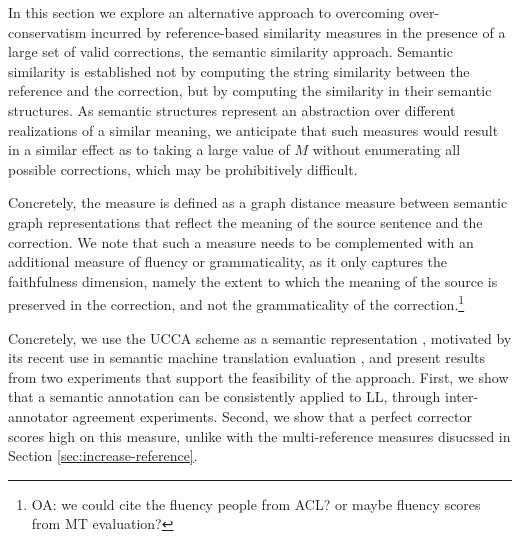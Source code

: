 \documentclass[letter,11pt]{article}
\newcommand{\oa}[1]{\footnote{\color{red}OA: #1}}
\begin{document}
		
		In this section we explore an alternative approach to overcoming over-conservatism
		incurred by reference-based similarity measures in the presence of a large set of
		valid corrections, the semantic similarity approach.
		Semantic similarity is established not by computing the string similarity between
		the reference and the correction, but by computing the similarity in their semantic
		structures. As semantic structures represent an abstraction over different realizations
		of a similar meaning, we anticipate that such measures would result in a similar
		effect as to taking a large value of $M$ without enumerating all possible corrections,
		which may be prohibitively difficult.
		
		Concretely, the measure is defined as a graph distance measure between
		semantic graph representations that reflect the meaning of the source
		sentence and the correction.
		We note that such a measure needs to be complemented with an additional
		measure of fluency or grammaticality, as it only captures
		the faithfulness dimension, namely the extent to which
		the meaning of the source is preserved in the correction,
		and not the grammaticality of the correction.\oa{we could cite the fluency people from ACL? or maybe fluency scores from MT evaluation?}
		
		Concretely,
		we use the UCCA scheme as a semantic representation \cite{abend2013universal}, motivated by
		its recent use in semantic machine translation evaluation \cite{birch2016hume},
		and present results from two experiments that support the feasibility of the approach.
		First, we show that a semantic annotation can be consistently applied to LL,
		through inter-annotator agreement experiments.
		Second, we show that a perfect corrector scores high on this measure, unlike with
		the multi-reference measures disucssed in Section \ref{sec:increase-reference}.
		
		
\end{document}
